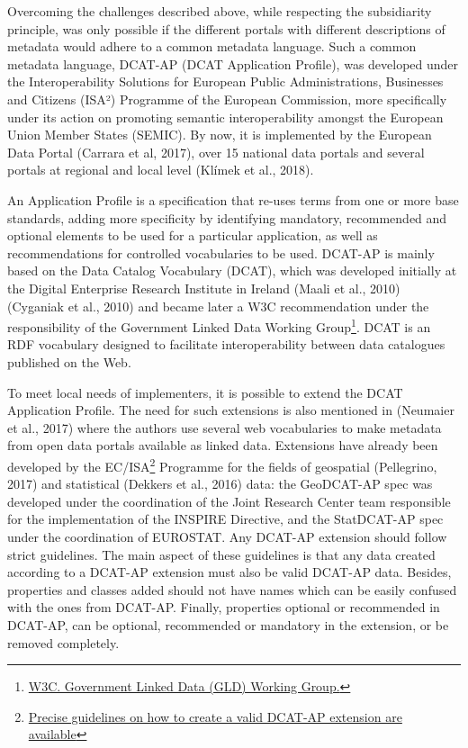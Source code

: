 \documentclass[<options>]{elsarticle}
\begin{document}
Overcoming the challenges described above, while respecting the subsidiarity principle, was only possible if the different portals with different descriptions of metadata would adhere to a common metadata language. Such a common metadata language, DCAT-AP (DCAT Application Profile), was developed under the Interoperability Solutions for European Public Administrations, Businesses and Citizens (ISA²) Programme of the European Commission, more specifically under its action on promoting semantic interoperability amongst the European Union Member States (SEMIC). By now, it is implemented by the European Data Portal (Carrara et al, 2017), over 15 national data portals and several portals at regional and local level (Klímek et al., 2018).

An Application Profile is a specification that re-uses terms from one or more base standards, adding more specificity by identifying mandatory, recommended and optional elements to be used for a particular application, as well as recommendations for controlled vocabularies to be used. DCAT-AP is mainly based on the Data Catalog Vocabulary (DCAT), which was developed initially at the Digital Enterprise Research Institute in Ireland (Maali et al., 2010) (Cyganiak et al., 2010) and became later a W3C recommendation under the responsibility of the Government Linked Data Working Group\footnote{\href{http://www.w3.org/2011/gld/wiki/Main_Page}{W3C. Government Linked Data (GLD) Working Group.}}. DCAT is an RDF vocabulary designed to facilitate interoperability between data catalogues published on the Web. 

To meet local needs of implementers, it is possible to extend the DCAT Application Profile. The need for such extensions is also mentioned in (Neumaier et al., 2017) where the authors use several web vocabularies to make metadata from open data portals available as linked data. Extensions have already been developed by the EC/ISA\footnote{\href{https://joinup.ec.europa.eu/node/150345/}{Precise guidelines on how to create a valid DCAT-AP extension are available}} Programme for the fields of geospatial (Pellegrino, 2017) and statistical (Dekkers et al., 2016) data: the GeoDCAT-AP spec was developed under the coordination of the Joint Research Center team responsible for the implementation of the INSPIRE Directive, and the StatDCAT-AP spec under the coordination of EUROSTAT. Any DCAT-AP extension should follow strict guidelines. The main aspect of these guidelines is that any data created according to a DCAT-AP extension must also be valid DCAT-AP data. Besides, properties and classes added should not have names which can be easily confused with the ones from DCAT-AP. Finally, properties optional or recommended in DCAT-AP, can be optional, recommended or mandatory in the extension, or be removed completely.
\end{document}
